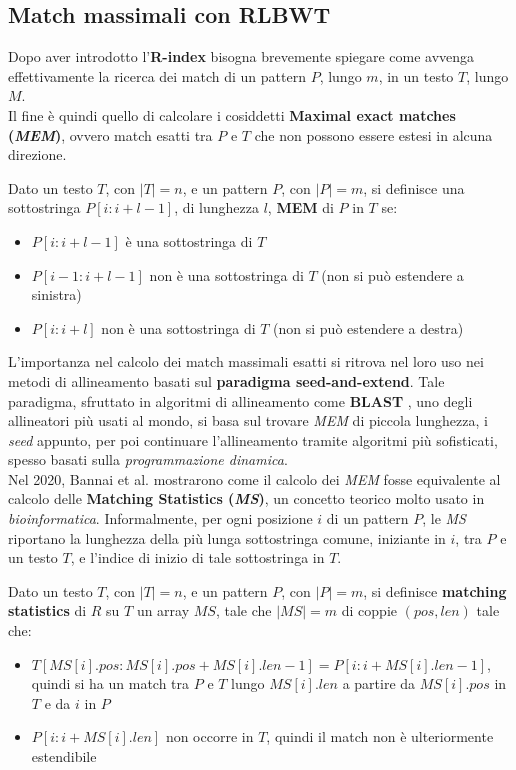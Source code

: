 \subsection{Match massimali con RLBWT}
Dopo aver introdotto l'\textbf{R-index} bisogna brevemente spiegare come avvenga
effettivamente la ricerca dei match di un pattern $P$, lungo $m$, in un
testo $T$, lungo $M$.\\
Il fine è quindi quello di calcolare i cosiddetti \textbf{Maximal exact matches
  (\textit{MEM})}, ovvero match esatti tra $P$ e $T$ che non possono essere
estesi in alcuna direzione.
\begin{definizione}
  Dato un testo $T$, con $|T|=n$, e un pattern $P$, con $|P|=m$, si definisce
  una sottostringa $P[i:i+l-1]$, di lunghezza $l$, \textbf{MEM} di $P$ in $T$
  se:
  \begin{itemize}
    \item $P[i:i+l-1]$ è una sottostringa di $T$
    \item $P[i-1:i+l-1]$ non è una sottostringa di $T$ (non si può estendere a
    sinistra) 
    \item $P[i:i+l]$ non è una sottostringa di $T$ (non si può estendere a
    destra) 
  \end{itemize}
\end{definizione}
L'importanza nel calcolo dei match massimali esatti si ritrova nel loro uso nei
metodi di allineamento basati sul \textbf{paradigma seed-and-extend}.
Tale paradigma, sfruttato in algoritmi di allineamento come \textbf{BLAST}
\cite{blast}, uno degli allineatori più usati al mondo, si basa sul trovare
\textit{MEM} di piccola lunghezza, i \textit{seed} appunto, per poi continuare
l'allineamento tramite algoritmi più sofisticati, spesso basati sulla
\textit{programmazione dinamica}. \\
Nel 2020, Bannai et al. \cite{bannai} mostrarono come il calcolo dei
\textit{MEM} fosse equivalente al calcolo delle \textbf{Matching Statistics
  (\textit{MS})}, un concetto teorico molto usato in
\textit{bioinformatica}. Informalmente, per ogni posizione $i$ di un pattern
$P$, le \textit{MS} riportano la lunghezza della più lunga sottostringa comune,
iniziante in $i$, tra $P$ e un testo $T$, e l'indice di inizio di tale
sottostringa in $T$.
\begin{definizione}
  Dato un testo $T$, con $|T|=n$, e un pattern $P$, con $|P|=m$, si definisce
  \textbf{matching statistics} di $R$ su $T$ un array $MS$, tale che $|MS|=m$
  di coppie $(pos, len)$ tale che:
  \begin{itemize}
    \item $T[MS[i].pos:MS[i].pos+MS[i].len-1]=P[i:i+MS[i].len-1]$, quindi si ha
    un match tra $P$ e $T$ lungo $MS[i].len$ a partire da $MS[i].pos$ in $T$ e
    da $i$ in $P$
    \item $P[i:i+MS[i].len]$ non occorre in $T$, quindi il match non è
    ulteriormente estendibile 
  \end{itemize}
\end{definizione}
